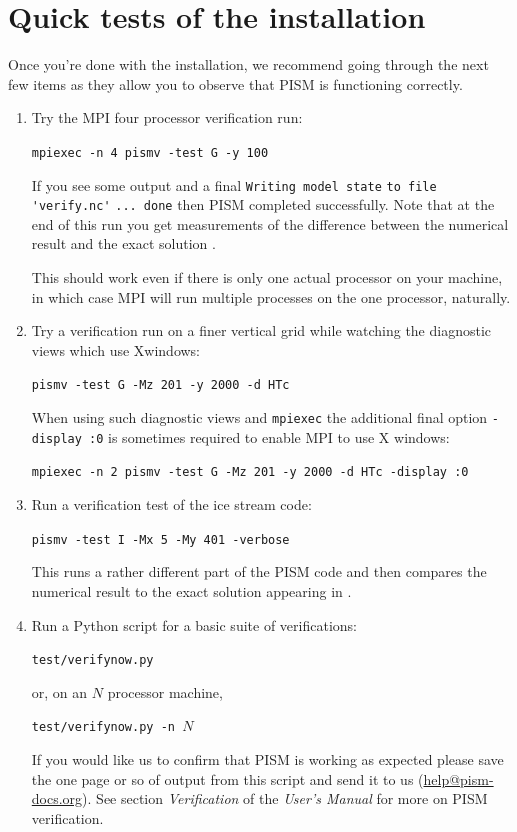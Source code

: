 \documentclass[11pt,final]{amsart}
\begin{document}
\section{Quick tests of the installation}
Once you're done with the installation, we recommend going through the next few items as they allow you to observe
that PISM is functioning correctly.
\begin{enumerate}
\item Try the MPI four processor verification run:

\verb|mpiexec -n 4 pismv -test G -y 100|

\noindent If you see some output and a final \verb|Writing model state| \verb|to file 'verify.nc'| \verb|... done| then PISM
completed successfully. Note that at the end of this run you get measurements of the difference between the numerical result and
the exact solution \cite{BBL}.

\noindent This should work even if there is only one actual processor on your machine, in which case MPI will run multiple
processes on the one processor, naturally.

\item Try a verification run on a finer vertical grid while watching the diagnostic views which use Xwindows:

\verb|pismv -test G -Mz 201 -y 2000 -d HTc|

\noindent When using such diagnostic views and \verb|mpiexec| the additional final option \verb|-display :0| is sometimes required to enable MPI to use X windows:

\verb|mpiexec -n 2 pismv -test G -Mz 201 -y 2000 -d HTc -display :0|

\item Run a verification test of the ice stream code:

\verb|pismv -test I -Mx 5 -My 401 -verbose|

\noindent This runs a rather different part of the PISM code and then compares the numerical result to the exact solution appearing in \cite{SchoofStream}.

\item Run a Python script for a basic suite of verifications:

\verb|test/verifynow.py|

\noindent or, on an $N$ processor machine,

\verb|test/verifynow.py -n |$N$

\noindent If you would like us to confirm that PISM is working as expected please save the one page or so of output from this script and send it to us (\href{mailto:help@pism-docs.org}{help@pism-docs.org}).  See section \emph{Verification} of the \emph{User's Manual} for more on PISM verification.
\end{enumerate}
\end{document}

